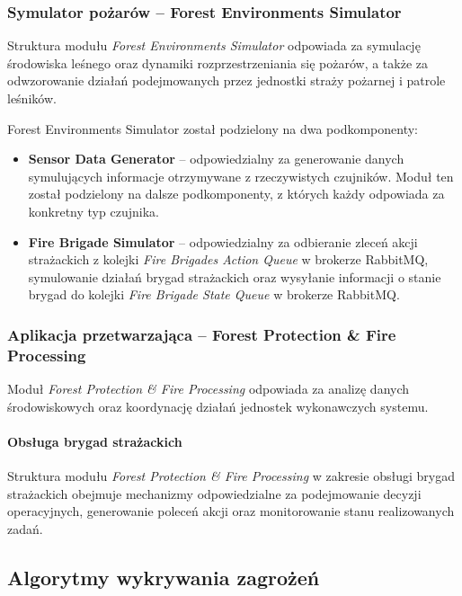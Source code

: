 \subsubsection{Symulator pożarów -- Forest Environments Simulator}

Struktura modułu \textit{Forest Environments Simulator} odpowiada za symulację środowiska leśnego oraz dynamiki rozprzestrzeniania się pożarów, a także za odwzorowanie działań podejmowanych przez jednostki straży pożarnej i patrole leśników.

Forest Environments Simulator został podzielony na dwa podkomponenty:

\begin{itemize}
    \item \textbf{Sensor Data Generator} – odpowiedzialny za generowanie danych symulujących informacje otrzymywane z rzeczywistych czujników. Moduł ten został podzielony na dalsze podkomponenty, z których każdy odpowiada za konkretny typ czujnika.
    \item \textbf{Fire Brigade Simulator} – odpowiedzialny za odbieranie zleceń akcji strażackich z kolejki \textit{Fire Brigades Action Queue} w brokerze RabbitMQ, symulowanie działań brygad strażackich oraz wysyłanie informacji o stanie brygad do kolejki \textit{Fire Brigade State Queue} w brokerze RabbitMQ.
\end{itemize}

\subsubsection{Aplikacja przetwarzająca -- Forest Protection \& Fire Processing}

Moduł \textit{Forest Protection \& Fire Processing} odpowiada za analizę danych środowiskowych oraz koordynację działań jednostek wykonawczych systemu.

\paragraph{Obsługa brygad strażackich}

Struktura modułu \textit{Forest Protection \& Fire Processing} w zakresie obsługi brygad strażackich obejmuje mechanizmy odpowiedzialne za podejmowanie decyzji operacyjnych, generowanie poleceń akcji oraz monitorowanie stanu realizowanych zadań.


\subsection{Algorytmy wykrywania zagrożeń}
\label{sec:detection}

